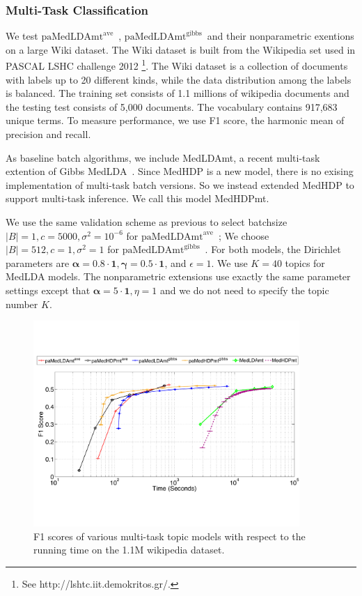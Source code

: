 \documentclass[twoside,11pt]{article}
\newcommand{\alphav}{\bm \alpha}
\newcommand{\gammav}{\bm \gamma}
\newcommand\paMedLDAmtave{$\text{paMedLDAmt}^{\text{ave}}$~}
\newcommand\paMedLDAmtgibbs{$\text{paMedLDAmt}^{\text{gibbs}}$~}
\begin{document}
\subsubsection{Multi-Task Classification}



We test \paMedLDAmtave, \paMedLDAmtgibbs and their nonparametric exentions on a large Wiki dataset. The Wiki dataset is built from the Wikipedia set used in PASCAL LSHC challenge 2012 \footnote{See http://lshtc.iit.demokritos.gr/.}. The Wiki dataset is a collection of documents with labels up to 20 different kinds, while the data distribution among the labels is balanced. The training set consists of 1.1 millions of wikipedia documents and the testing test consists of 5,000 documents. The vocabulary contains 917,683 unique terms.
To measure performance, we use F1 score, the harmonic mean of precision and recall.

As baseline batch algorithms, we include MedLDAmt, a recent multi-task extention of Gibbs MedLDA~\citep{zhu2013scalable}. Since MedHDP is a new model, there is no exising implementation of multi-task batch versions. So we instead extended MedHDP to support multi-task inference. We call this model MedHDPmt.

We use the same validation scheme as previous to select batchsize $|B| = 1, c = 5000, \sigma^2 = 10^{-6}$ for \paMedLDAmtave; We choose $|B| = 512, c = 1, \sigma^2 = 1$ for \paMedLDAmtgibbs. For both models, the Dirichlet parameters are $\alphav = 0.8 \cdot \bm{1}, \gammav = 0.5 \cdot \bm{1}$,  and $\epsilon = 1$. We use $K = 40$ topics for MedLDA models. The nonparametric extensions use exactly the same parameter settings except that $\alphav = 5 \cdot \bm{1}, \eta = 1$ and we do not need to specify the topic number $K$.

\begin{figure}[t]
\centering
\includegraphics[width = 0.9\textwidth]{plot_mtask_commit_jmlr.pdf}
\vspace*{-0.2cm}
\caption{F1 scores of various multi-task topic models with respect to the running time on the 1.1M wikipedia dataset.}
\vspace*{-0.4cm}
\label{fg:multic_mtask_commit}
\end{figure}
\end{document}
